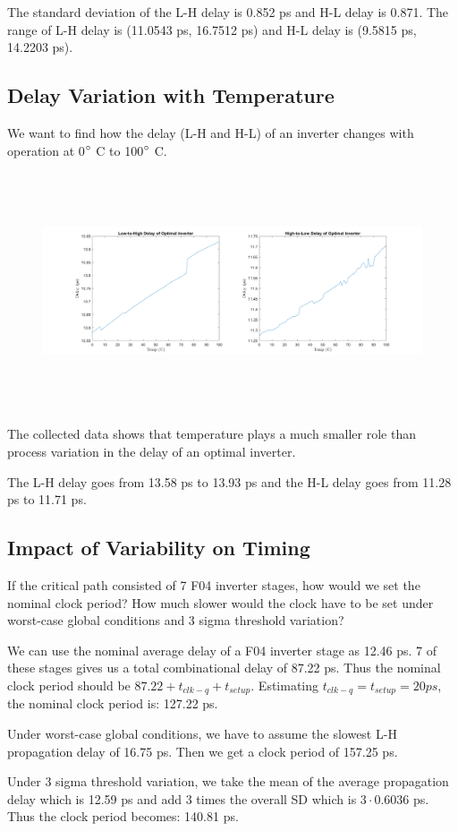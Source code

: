 \documentclass[11pt]{article}
\begin{document}
The standard deviation of the L-H delay is 0.852 ps and H-L delay is 0.871. The range of L-H delay is (11.0543 ps, 16.7512 ps) and H-L delay is (9.5815 ps, 14.2203 ps).

\subsection{Delay Variation with Temperature}
We want to find how the delay (L-H and H-L) of an inverter changes with operation at 0$\degree$ C to 100$\degree$ C.

\begin{figure}[H]
	\centerline{\includegraphics[height=7cm]{images/temp_variation.png}}
\end{figure}

The collected data shows that temperature plays a much smaller role than process variation in the delay of an optimal inverter.

The L-H delay goes from 13.58 ps to 13.93 ps and the H-L delay goes from 11.28 ps to 11.71 ps.

\subsection{Impact of Variability on Timing}
If the critical path consisted of 7 F04 inverter stages, how would we set the nominal clock period? How much slower would the clock have to be set under worst-case global conditions and 3 sigma threshold variation?

We can use the nominal average delay of a F04 inverter stage as 12.46 ps. 7 of these stages gives us a total combinational delay of 87.22 ps. Thus the nominal clock period should be $87.22 + t_{clk-q} + t_{setup}$. Estimating $t_{clk-q} = t_{setup} = 20 ps$, the nominal clock period is: 127.22 ps.

Under worst-case global conditions, we have to assume the slowest L-H propagation delay of 16.75 ps. Then we get a clock period of 157.25 ps.

Under 3 sigma threshold variation, we take the mean of the average propagation delay which is 12.59 ps and add 3 times the overall SD which is $3 \cdot 0.6036$ ps. Thus the clock period becomes: 140.81 ps.

\newpage
\appendix
\end{document}
